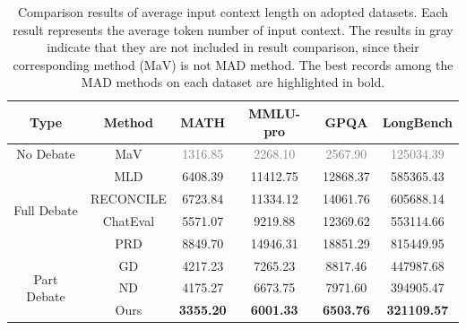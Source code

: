 \begin{table}
  \centering
  \setlength{\tabcolsep}{3mm}
 \begin{tabular}{c|c|cccc}
\toprule
Type    &Method              & MATH            & MMLU-pro         & GPQA     & LongBench              \\ \midrule
No Debate   & MaV                 & \textcolor{gray}{1316.85}          & \textcolor{gray}{2268.10}          & \textcolor{gray}{2567.90}          & \textcolor{gray}{125034.39}           \\   \midrule
\multirow{4}{*}{Full Debate}   & MLD                 & 6408.39 & 11412.75 & 12868.37 & 585365.43          \\
& RECONCILE           & 6723.84 & 11334.12 & 14061.76 & 605688.14          \\
& ChatEval             & 5571.07 & 9219.88  & 12369.62 & 553114.66          \\
& PRD                 & 8849.70 & 14946.31 & 18851.29 & 815449.95          \\  \midrule
\multirow{3}{*}{Part Debate}   & GD          & 4217.23 & 7265.23  & 8817.46  & 447987.68          \\
& ND                  & 4175.27 & 6673.75  & 7971.60  & 394905.47          \\  \cmidrule{2-6}
& Ours & \textbf{3355.20} & \textbf{6001.33}  & \textbf{6503.76}  & \textbf{321109.57} \\ \bottomrule
\end{tabular}
  \caption{\label{table_appendix_additional_exp_token}
   Comparison results of average input context length on adopted datasets. Each result represents the average token number of input context. The results in gray indicate that they are not included in result comparison, since their corresponding method (MaV) is not MAD method. The best records among the MAD methods on each dataset are highlighted in bold.
  }
\end{table}